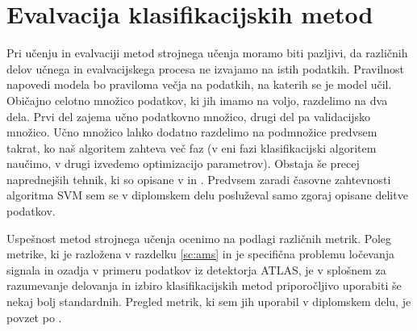 \documentclass[11pt,a4paper,openany]{book}
\begin{document}
\section{Evalvacija klasifikacijskih metod}

Pri učenju in evalvaciji metod strojnega učenja moramo biti pazljivi, da različnih delov učnega in evalvacijskega procesa ne izvajamo na istih podatkih. Pravilnost napovedi modela bo praviloma večja na podatkih, na katerih se je model učil. Običajno celotno množico podatkov, ki jih imamo na voljo, razdelimo na dva dela. Prvi del zajema učno podatkovno množico, drugi del pa validacijsko množico. Učno množico lahko dodatno razdelimo na podmnožice predvsem takrat, ko naš algoritem zahteva več faz (v eni fazi klasifikacijski algoritem naučimo, v drugi izvedemo optimizacijo parametrov). Obstaja še precej naprednejših tehnik, ki so opisane v \cite{Mitchell1997} in \cite{Witten2005}. Predvsem zaradi časovne zahtevnosti algoritma SVM sem se v diplomskem delu posluževal samo zgoraj opisane delitve podatkov.

Uspešnost metod strojnega učenja ocenimo na podlagi različnih metrik. Poleg metrike, ki je razložena v razdelku \ref{sc:ams} in je specifična problemu ločevanja signala in ozadja v primeru podatkov iz detektorja ATLAS, je v splošnem za razumevanje delovanja in izbiro klasifikacijskih metod priporočljivo uporabiti še nekaj bolj standardnih. Pregled metrik, ki sem jih uporabil v diplomskem delu, je povzet po \cite{wiki:precision_and_recall}.
\end{document}
